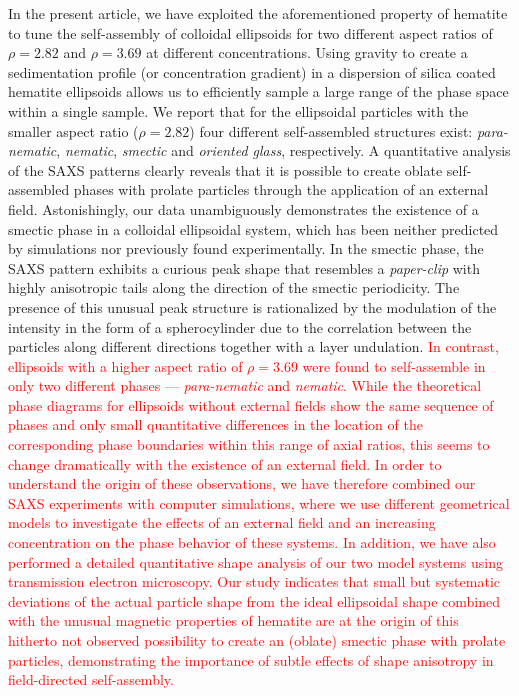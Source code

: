 \documentclass[aps,prl,preprint,superscriptaddress]{revtex4-1} %
\begin{document}
In the present article, we have exploited the aforementioned property of hematite to tune the self-assembly of colloidal ellipsoids for two different aspect ratios of $\rho = 2.82$ and $\rho = 3.69$ at different concentrations. Using gravity to create a sedimentation profile (or concentration gradient) in a dispersion of silica coated hematite ellipsoids allows us to efficiently sample a large range of the phase space within a single sample. We report that for the ellipsoidal particles with the smaller aspect ratio ($\rho=2.82$) four different self-assembled structures exist: \emph{para-nematic}, \emph{nematic}, \emph{smectic} and \emph{oriented glass}, respectively. A quantitative analysis of the SAXS patterns clearly reveals that it is possible to create oblate self-assembled phases with prolate particles through the application of an external field. Astonishingly, our data unambiguously demonstrates the existence of a smectic phase in a colloidal ellipsoidal system, which has been neither predicted by simulations nor previously found experimentally. In the smectic phase, the SAXS pattern exhibits a curious peak shape that resembles a \textit{paper-clip} with highly anisotropic tails along the direction of the smectic periodicity. The presence of this unusual peak structure is rationalized by the modulation of the intensity in the form of a spherocylinder due to the correlation between the particles along different directions together with a layer undulation. \textcolor{red}{In contrast, ellipsoids with a higher aspect ratio of $\rho=3.69$ were found to self-assemble in only two different phases --- \emph{para-nematic} and \emph{nematic}. While the theoretical phase diagrams for ellipsoids without external fields show the same sequence of phases and only small quantitative differences in the location of the corresponding phase boundaries within this range of axial ratios, this seems to change dramatically with the existence of an external field. In order to understand the origin of these observations, we have therefore combined our SAXS experiments with computer simulations, where we use different geometrical models to investigate the effects of an external field and an increasing concentration on the phase behavior of these systems. In addition, we have also performed a detailed quantitative shape analysis of our two model systems using transmission electron microscopy. Our study indicates that small but systematic deviations of the actual particle shape from the ideal ellipsoidal shape combined with the unusual magnetic properties of hematite are at the origin of this hitherto not observed possibility to create an (oblate) smectic phase with prolate particles, demonstrating the importance of subtle effects of shape anisotropy in field-directed self-assembly. }
\end{document}
